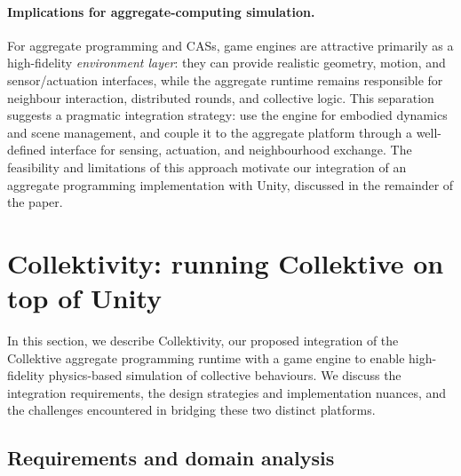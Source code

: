 \paragraph{Implications for aggregate-computing simulation.}

For aggregate programming and \acp{CAS}, game engines are attractive primarily as a
high-fidelity \emph{environment layer}: they can provide realistic geometry, motion,
and sensor/actuation interfaces, while the aggregate runtime remains responsible for neighbour
interaction, distributed rounds, and collective logic.
%
This separation suggests a pragmatic integration strategy: use the engine for embodied dynamics
and scene management, and couple it to the aggregate platform through a well-defined interface
for sensing, actuation, and neighbourhood exchange.
%
The feasibility and limitations of this approach motivate our integration of an aggregate
programming implementation with Unity, discussed in the remainder of the paper.

\section{Collektivity: running Collektive on top of Unity}\label{sec:integrating-collektive-with-unity}

In this section, we describe Collektivity,
our proposed integration of the Collektive aggregate programming runtime with a game engine
to enable high-fidelity physics-based simulation of collective behaviours.
%
We discuss the integration requirements,
the design strategies and implementation nuances,
and the challenges encountered in bridging these two distinct platforms.

\subsection{Requirements and domain analysis}\label{subsec:requirements}

